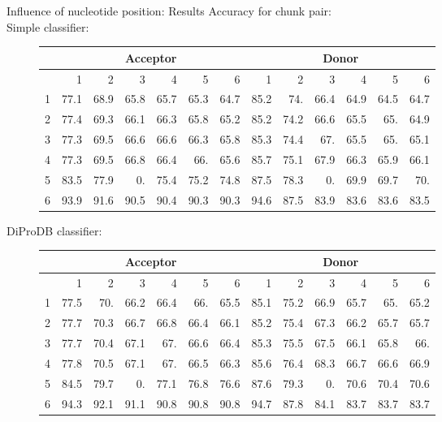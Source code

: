 \documentclass[10pt]{beamer}
\begin{document}
\begin{frame}{Influence of nucleotide position: Results}
	Accuracy for chunk pair:\\
	Simple classifier:
	\begin{figure}
	\scriptsize
	\begingroup
	\centering
	\def\arraystretch{1.1}
	\begin{tabular}{|r|r|r|r|r|r|r|r|r|r|r|r|r|}
		\hline
		&\multicolumn{6}{c|}{Acceptor}&\multicolumn{6}{c|}{Donor}\\
		\hline
		&1&2&3&4&5&6&1&2&3&4&5&6\\
		\hline
		1&77.1&68.9&65.8&65.7&65.3&64.7&85.2&74. &66.4&64.9&64.5&64.7\\
		2&77.4&69.3&66.1&66.3&65.8&65.2&85.2&74.2&66.6&65.5&65. &64.9\\
		3&77.3&69.5&66.6&66.6&66.3&65.8&85.3&74.4&67. &65.5&65. &65.1\\
		4&77.3&69.5&66.8&66.4&66. &65.6&85.7&75.1&67.9&66.3&65.9&66.1\\
		5&83.5&77.9& 0. &75.4&75.2&74.8&87.5&78.3& 0. &69.9&69.7&70. \\
		6&93.9&91.6&90.5&90.4&90.3&90.3&94.6&87.5&83.9&83.6&83.6&83.5\\
		
		\hline 
	\end{tabular}
	\endgroup	
	\end{figure}

	DiProDB classifier:
	\begin{figure}
		\scriptsize
		\begingroup
		\centering
		\def\arraystretch{1.1}
		\begin{tabular}{|r|r|r|r|r|r|r|r|r|r|r|r|r|}
			\hline
			&\multicolumn{6}{c|}{Acceptor}&\multicolumn{6}{c|}{Donor}\\
			\hline
			&1&2&3&4&5&6&1&2&3&4&5&6\\
			\hline
			1&77.5&70. &66.2&66.4&66. &65.5&85.1&75.2&66.9&65.7&65. &65.2\\
			2&77.7&70.3&66.7&66.8&66.4&66.1&85.2&75.4&67.3&66.2&65.7&65.7\\
			3&77.7&70.4&67.1&67. &66.6&66.4&85.3&75.5&67.5&66.1&65.8&66. \\
			4&77.8&70.5&67.1&67. &66.5&66.3&85.6&76.4&68.3&66.7&66.6&66.9\\
			5&84.5&79.7& 0. &77.1&76.8&76.6&87.6&79.3& 0. &70.6&70.4&70.6\\
			6&94.3&92.1&91.1&90.8&90.8&90.8&94.7&87.8&84.1&83.7&83.7&83.7\\
			
			\hline 
		\end{tabular}
		\endgroup	
	\end{figure}
\end{frame}
\end{document}
